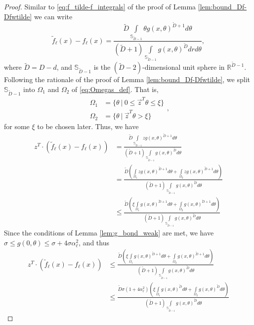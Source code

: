 \documentclass[12pt]{article}
\theoremstyle{remark}
\newcommand{\RR}{\mathbb{R}}
\newcommand{\wtilde}[1]{\widetilde{#1}}
\begin{document}
\begin{appendices}
\begin{proof}
Similar to \eqref{eq:f_tilde-f_integrals} of the proof of Lemma \ref{lem:bound_Df-Dfwtilde} we can write 
\begin{equation*}
\wtilde{f}_\ell(x) - f_\ell(x)=
\frac{\wtilde D\int\limits_{\mathbb{S}_{\wtilde D-1}}\theta g(x,\theta)^{\wtilde D+1} d\theta}{(\wtilde D+1)\int\limits_{\mathbb{S}_{\wtilde D-1}}g(x,\theta)^{\wtilde D} drd\theta}    ,\end{equation*}
where $\wtilde D = D - d$, and $\mathbb{S}_{\wtilde D - 1}$ is the $({\wtilde D - 2})$-dimensional unit sphere in $\RR^{\wtilde D - 1}$.
Following the rationale of the proof of Lemma \ref{lem:bound_Df-Dfwtilde}, we split $\mathbb{S}_{\wtilde D-1}$ into $\Omega_1$ and $\Omega_2$ of \eqref{eq:Omegas_def}.
That is,
\begin{equation*}
    \begin{aligned}
    \Omega_1 &= \{\theta~|~0\leq \vec{z}^T\theta \leq \xi\}\\
    \Omega_2 &= \{\theta~|~\vec{z}^T\theta > \xi\}
    \end{aligned}
,\end{equation*}
for some $\xi$ to be chosen later.
Thus, we have  
\begin{align*}
z^T\cdot (\wtilde{f}_\ell(x) - f_\ell(x))&=
\frac{\wtilde D\int\limits_{\mathbb{S}_{\wtilde D-1}}z g(x,\theta)^{\wtilde D+1} d\theta}{(\wtilde D+1)\int\limits_{\mathbb{S}_{\wtilde D-1}}g(x,\theta)^{\wtilde D} d\theta} 
\\
&=\frac{\wtilde D\left(\int\limits_{\Omega_1}z g(x,\theta)^{\wtilde D+1} d\theta + \int\limits_{\Omega_2}z g(x,\theta)^{\wtilde D+1} d\theta\right)}{(\wtilde D+1)\int\limits_{\mathbb{S}_{\wtilde D-1}}g(x,\theta)^{\wtilde D} d\theta} 
\\
&\leq  \frac{\wtilde D\left(\xi \int\limits_{\Omega_1} g(x,\theta)^{\wtilde D+1} d\theta + \int\limits_{\Omega_2} g(x,\theta)^{\wtilde D+1} d\theta\right)}{(\wtilde D+1)\int\limits_{\mathbb{S}_{\wtilde D-1}}g(x,\theta)^{\wtilde D} d\theta} 
\end{align*}
Since the conditions of Lemma \ref{lem:g_bond_weak} are met, we have $\sigma \leq g(0,\theta)\leq \sigma + 4\sigma \alpha_\ell ^2$, and thus
\begin{align*}
z^T\cdot (\wtilde{f}_\ell(x) - f_\ell(x))
&\leq  \frac{\wtilde D\left(\xi \int\limits_{\Omega_1} g(x,\theta)^{\wtilde D+1} d\theta + \int\limits_{\Omega_2} g(x,\theta)^{\wtilde D+1} d\theta\right)}{(\wtilde D+1)\int\limits_{\mathbb{S}_{\wtilde D-1}}g(x,\theta)^{\wtilde D} d\theta}
\\
&\leq  \frac{\wtilde D\sigma(1+4\alpha_\ell ^2)\left(\xi  \int\limits_{\Omega_1} g(x,\theta)^{\wtilde D} d\theta + \int\limits_{\Omega_2} g(x,\theta)^{\wtilde D} d\theta\right)}{(\wtilde D+1)\int\limits_{\mathbb{S}_{\wtilde D-1}}g(x,\theta)^{\wtilde D} d\theta}

\end{align*}
\end{proof}
\end{appendices}
\end{document}
